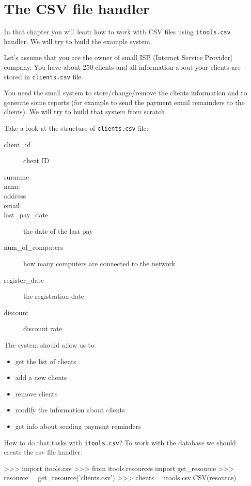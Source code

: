 \documentclass[a4paper]{book}
\begin{document}
\chapter{The CSV file handler}

In that chapter you will learn how to work with CSV files using
{\tt itools.csv} handler. We will try to build the example system.

Let's assume that you are the owner of small ISP (Internet Service
Provider) company. You have about 250 clients and all information
about your clients are stored in {\tt clients.csv} file.

You need the small system to store/change/remove the clients information
and to generate some reports (for example to send the payment email 
remainders to the clients). We will try to build that system from 
scratch.

Take a look at the structure of {\tt clients.csv} file:
\begin{description}
    \item [client\_id] client ID
    \item [surname] 
    \item [name] 
    \item [address]
    \item [email] 
    \item [last\_pay\_date] the date of the last pay 
    \item [num\_of\_computers] how many computers are connected to the network
    \item [register\_date] the registration date
    \item [discount] discount rate
\end{description}

The system should allow us to:
\begin{itemize}
    \item get the list of clients
    \item add a new clients
    \item remove clients 
    \item modify the information about clients
    \item get info about sending payment reminders 
\end{itemize}

How to do that tasks with {\tt itools.csv}? To work with the
database we should create the csv file handler:
\begin{code}
    >>> import itools.csv
    >>> from itools.resources import get_resource
    >>> resource = get_resource('clients.csv')
    >>> clients = itools.csv.CSV(resource)
\end{code}
\end{document}
